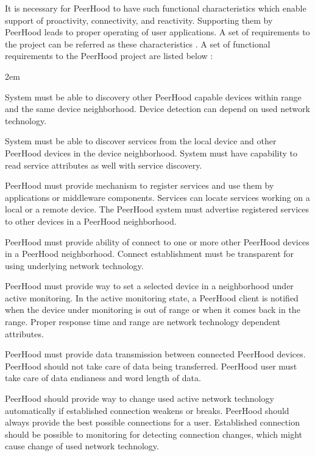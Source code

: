 %
It is necessary for PeerHood to have such functional characteristics which enable support of proactivity, connectivity, and reactivity. 
%
Supporting them by PeerHood leads to proper operating of user applications. 
%
A set of requirements to the project can be referred as these characteristics . 
%
A set of functional requirements to the PeerHood project are listed below  : 
\begin{description}
	\leftskip2em%
	\setlength{\itemsep}{0pt}%
	\setlength{\parsep}{0pt}%

	\item[Device discovery] System must be able to discovery other PeerHood capable devices within range and the same device neighborhood.
	Device detection can depend on used network technology.
		
	\item[Service discovery] System must be able to discover services from the local device and other PeerHood devices in the device neighborhood.
	System must have capability to read service attributes as well with service discovery.

	\item[Service sharing] PeerHood must provide mechanism to register services and use them by applications or middleware components. 
	Services can locate services working on a local or a remote device. 
	The PeerHood system must advertise registered services to other devices in a PeerHood neighborhood.

	\item[Connection establishment] PeerHood must provide ability of connect to one or more other PeerHood devices in a PeerHood neighborhood. 
	Connect establishment must be transparent for using underlying network technology.

	\item[Active monitoring of a device] PeerHood must provide way to set a selected device in a neighborhood under active monitoring. 
	In the active monitoring state, a PeerHood client is notified when the device under monitoring is out of range or when it comes back in the range. 
	Proper response time and range are network technology dependent attributes.

	\item[Data transmission between devices] PeerHood must provide data transmission between connected PeerHood devices. 
	PeerHood should not take care of data being transferred. 
	PeerHood user must take care of data endianess and word length of data.

	\item[Seamless connectivity] PeerHood should provide way to change used active network technology automatically if established connection weakens or breaks. 
	PeerHood should always provide the best possible connections for a user. 
	Established connection should be possible to monitoring for detecting connection changes, which might cause change of used network technology.
\end{description}

